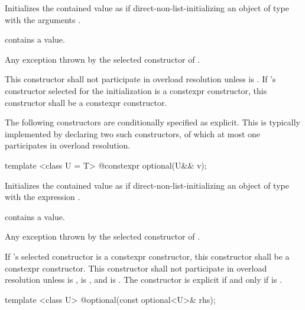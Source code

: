 \begin{itemdescr}
\pnum
\effects
Initializes the contained value as if direct-non-list-initializing an object of type  with the arguments .

\pnum
\postconditions
{} contains a value.

\pnum
\throws
Any exception thrown by the selected constructor of .

\pnum
\remarks
This constructor shall not participate in overload resolution unless  is .
If 's constructor selected for the initialization is a constexpr constructor, this constructor shall be a constexpr constructor.
\end{itemdescr}

\pnum
\begin{note}
The following constructors are conditionally specified as explicit.
This is typically implemented by declaring two such constructors,
of which at most one participates in overload resolution.
\end{note}

%
\begin{itemdecl}
template <class U = T> @\EXPLICIT@ constexpr optional(U&& v);
\end{itemdecl}

\begin{itemdescr}
\pnum
\effects
Initializes the contained value as if direct-non-list-initializing
an object of type  with the expression .

\pnum
\postconditions
{} contains a value.

\pnum
\throws
Any exception thrown by the selected constructor of .

\pnum
\remarks
If 's selected constructor is a constexpr constructor,
this constructor shall be a constexpr constructor.
This constructor shall not participate in overload resolution unless
 is ,
 is , and
 is .
The constructor is explicit if and only if
 is .
\end{itemdescr}

%
\begin{itemdecl}
template <class U> @\EXPLICIT@ optional(const optional<U>& rhs);
\end{itemdecl}

